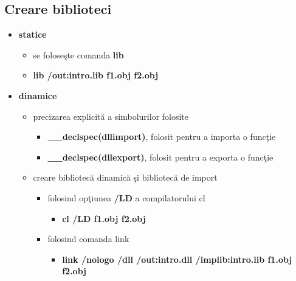 \documentclass{refcard.cs.pub.ro}
\begin{document}
\begin{multicols*}{3}
\subsection{Creare biblioteci}
\begin{itemize}
  \item \textbf{statice}
    \begin{itemize}
    	 \item se foloseşte comanda \textbf{lib}
       \item \textbf{lib /out:intro.lib f1.obj f2.obj}
    \end{itemize}
  \item \textbf{dinamice}  
    \begin{itemize}
    	  \item precizarea explicită a simbolurilor folosite
    	  \begin{itemize}
    	  \item \textbf{__declspec(dllimport)}, folosit pentru a importa o funcţie
    	  \item \textbf{__declspec(dllexport)}, folosit pentru a exporta o funcţie
    	  \end{itemize}
        \item creare bibliotecă dinamică şi bibliotecă de import
        \begin{itemize}
        \item folosind opţiunea \textbf{/LD} a compilatorului cl
        \begin{itemize}
         \item \textbf{cl /LD f1.obj f2.obj}
        \end{itemize}
        \item folosind comanda link
        \begin{itemize}
        \item \textbf{link /nologo /dll /out:intro.dll /implib:intro.lib f1.obj f2.obj}
        \end{itemize}
        \end{itemize} 
    \end{itemize}  
\end{itemize}

\end{multicols*}
\end{document}
